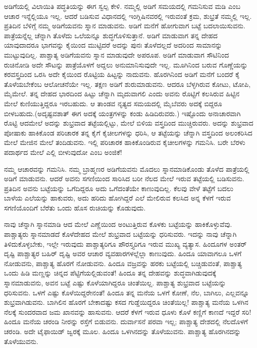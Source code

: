 ಅಡಿಗೆಯಲ್ಲಿ ವಿಲಾಯಿತಿ ಪದ್ಧತಿಯನ್ನು ಈಗ ಸ್ವಲ್ಪ ಕೇಳಿ. ನಮ್ಮಲ್ಲಿ ಅಡಿಗೆ ಸಮಯದಲ್ಲಿ ಗಮನಿಸುವ ಮಡಿ ಎಂಬ ಆಚಾರ ಇನ್ನೆಲ್ಲಿಯೂ ಇಲ್ಲ. ಆದರೆ ಬಡಿಸುವ ವಿಧಾನದಲ್ಲಿ ಇಂಗ್ಲಿಷಿನವರಲ್ಲಿ ಇರುವಂತೆ ಕ್ರಮ, ಶುಭ್ರತೆ ನಮ್ಮಲ್ಲಿ ಇಲ್ಲ. ಪ್ರತಿದಿನ ಬೆಳಿಗ್ಗೆ ನಮ್ಮ ಅಡಿಗೆಯವನು ಸ್ನಾನ ಮಾಡುವನು. ಅಡಿಗೆ ಮನೆಗೆ ಹೋಗುವಾಗ ಬಟ್ಟೆ ಬದಲಾಯಿಸು\break ವನು. ಪಾತ್ರೆಯನ್ನೆಲ್ಲ ಚೆನ್ನಾಗಿ ತೊಳೆದು ಒಲೆಯನ್ನೂ ಶುದ್ಧಗೊಳಿಸುತ್ತಾನೆ. ಅಡಿಗೆ ಮಾಡುವಾಗ ತನ್ನ ದೇಹದ ಯಾವುದಾದರೂ ಭಾಗವನ್ನು ಕೈಯಿಂದ ಮುಟ್ಟಿದರೆ ಅದನ್ನು ಪುನಃ ತೊಳೆದಲ್ಲದೆ ಅದರಿಂದ ಸಾಮಾನನ್ನು ಮುಟ್ಟುವುದಿಲ್ಲ. ಪಾಶ್ಚಾತ್ಯ ಅಡಿಗೆಯವನು ಸ್ನಾನ ಮಾಡುವುದೇ ಅಪರೂಪ. ಅಡಿಗೆ ಮಾಡುವಾಗ ಸೌಟಿನಿಂದ ರುಚಿನೋಡಿ ಅದೇ ಸೌಟನ್ನು ಪಾತ್ರೆಯೊಳಗೆ ಅದ್ದಲು ಅನುಮಾನಿಸುವುದೇ ಇಲ್ಲ. ಮೂಗಿನಿಂದ ಬರುವ ಗೊಣ್ಣೆಯನ್ನು ಕರವಸ್ತ್ರದಿಂದ ಒರಸಿ ಅದೇ ಕೈಯಿಂದ ರೊಟ್ಟಿಯ ಹಿಟ್ಟನ್ನು ನಾದುವನು. ಹೊರಗಿನಿಂದ ಅಡಿಗೆ ಮನೆಗೆ ಬಂದರೆ ಕೈ ತೊಳೆಯಬೇಕೆಂಬ ಆಲೋಚನೆಯೇ ಇಲ್ಲ. ತಕ್ಷಣ ಅಡಿಗೆ ಶುರುಮಾಡುವನು. ಆದರೂ ಬೆಳ್ಳಗಿರುವ ಕೋಟು, ಟೋಪಿ, ಮೈಮೇಲೆ. ತನ್ನ ದೇಹದ ಭಾರದಿಂದ ಹಿಟ್ಟು ಚೆನ್ನಾಗಿ ಮೃದುವಾಗಲಿ ಎಂದು ಅವನು ರೊಟ್ಟಿಗೆ ಕಲಸಿರುವ ಹಿಟ್ಟಿನ ಮೇಲೆ ಕುಣಿಯುತ್ತಿದ್ದರೂ ಇರಬಹುದು. ಆ ತಾಂಡವ ನೃತ್ಯದ ಸಮಯದಲ್ಲಿ ಮೈಬೆವರು ಅದಕ್ಕೆ ಬಿದ್ದರೂ ಬೀಳಬಹುದು.(ಅದೃಷ್ಟವಶಾತ್​ ಈಗ ಅದಕ್ಕೆ ಯಂತ್ರಗಳನ್ನು ಕಂಡು ಹಿಡಿದಿರುವರು.) ಇಷ್ಟೊಂದು ಅನಾಚಾರವಾಗಿ ರೊಟ್ಟಿ ಆದಮೇಲೆ ಅದನ್ನು ಶುಭ್ರವಾದ ತಟ್ಟೆಯಲ್ಲಿಟ್ಟು, ಮೇಲೆ ಬಿಳಿಯ ವಸ್ತ್ರದಿಂದ ಮುಚ್ಚಿರುವರು. ಅದನ್ನು ಶುಭ್ರವಾದ ಪೋಷಾಕು ಹಾಕಿಕೊಂಡ ಪರಿಚಾರಕ ತನ್ನ ಕೈಗೆ ಕೈಚೀಲಗಳನ್ನು ಧರಿಸಿ, ಆ ತಟ್ಟೆಯನ್ನು ಚೆನ್ನಾಗಿ ವಸ್ತ್ರದಿಂದ ಅಲಂಕರಿಸಿದ ಮೇಲೆ ಮೇಜಿನ ಮೇಲೆ ತಂದಿಡುವನು. ಇಲ್ಲಿ ಪರಿಚಾರಕ ಹಾಕಿಕೊಂಡಿರುವ ಕೈಚೀಲಗಳನ್ನು ಗಮನಿಸಿ. ಬರೇ ಬೆರಳು ಪದಾರ್ಥದ ಮೇಲೆ ಎಲ್ಲಿ ಬೀಳುವುದೋ ಎಂಬ ಅಂಜಿಕೆ!

ನಮ್ಮ ಆಚಾರವನ್ನು ಗಮನಿಸಿ. ನಮ್ಮ ಬ್ರಾಹ್ಮಣರ ಅಡಿಗೆಯವನು ಮೊದಲು ಸ್ನಾನಮಾಡಿಕೊಂಡು ತೊಳೆದ ಪಾತ್ರೆಯಲ್ಲಿ ಅಡಿಗೆ ಮಾಡುವನು. ಆದರೆ ಅವನು ಸಗಣಿ\break ಯಿಂದ ಸಾರಿಸಿದ ಬರೀ ನೆಲದ ಮೇಲೆ ಇರುವ ತಟ್ಟೆಯಲ್ಲಿ ಬಡಿಸುವನು. ಪ್ರತಿದಿನ ಅವನು ಬಟ್ಟೆಯನ್ನು ಒಗೆದಿದ್ದರೂ ಅದು ಒಗೆದಂತೆಯೇ ಕಾಣುವುದಿಲ್ಲ. ಕೆಲವು ವೇಳೆ ತಟ್ಟೆಗೆ ಬದಲು ಬಾಳೆಯ ಎಲೆಯನ್ನು ಹಾಕುವರು, ಅದು ಹರಿದು ಹೋಗಿದ್ದರೆ ಎಲೆ ಮೇಲಿರುವ ಕಲಸಿದ ಅನ್ನ ಕೆಳಗೆ ಇರುವ ಸಗಣಿಯೊಂದಿಗೆ ಬೆರೆತು ಒಂದು ಹೊಸ ರುಚಿಯನ್ನು ಕೊಡುವುದು.

\newpage

ನಾವು ಚೆನ್ನಾಗಿ ಸ್ನಾನಮಾಡಿ ಆದ ಮೇಲೆ ಎಣ್ಣೆಯಿಂದ ಅಂಟುತ್ತಿರುವ ಕೊಳಕು ಬಟ್ಟೆಯನ್ನು ಹಾಕಿಕೊಳ್ಳುವೆವು. ಪಾಶ್ಚಾತ್ಯರು ಸ್ನಾನಮಾಡದೆ ಕೊಳೆದೇಹದ ಮೇಲೆ ಶುಭ್ರ\break ವಾದ ಬಟ್ಟೆಯನ್ನು ಧರಿಸುವರು. ಇದನ್ನು ನಾವು ಚೆನ್ನಾಗಿ ತಿಳಿದುಕೊಳ್ಳಬೇಕು, ಇಲ್ಲೇ ಇರುವುದು ಪಾಶ್ಚಾತ್ಯರಿಗೂ ಪೌರಸ್ತ್ಯರಿಗೂ ಇರುವ ಮುಖ್ಯ ವ್ಯತ್ಯಾಸ. ಹಿಂದೂಗಳ ಅಂತರ್​ ದೃಷ್ಟಿ ಪಾಶ್ಚಾತ್ಯರ ಬಹಿರ್​ ದೃಷ್ಟಿ ಅವರ ಆಚಾರ ವ್ಯವಹಾರಗಳಲ್ಲೆಲ್ಲಾ ಕಾಣುವುದು. ಹಿಂದೂ ಯಾವಾಗಲೂ ಒಳಗೆ ನೋಡುವನು, ಪಾಶ್ಚಾತ್ಯ ಹೊರಗೆ ನೋಡುವನು. ಹಿಂದೂ ವಜ್ರವನ್ನು ಹರಕು ಬಟ್ಟೆಯಲ್ಲಿ ಬಚ್ಚಿಡುವಂತೆ, ಪಾಶ್ಚಾತ್ಯ ಒಂದು ಹಿಡಿ ಮಣ್ಣನ್ನು ಚಿನ್ನದ ಪೆಟ್ಟಿಗೆಯಲ್ಲಿಡುವಂತೆ! ಹಿಂದೂ ತನ್ನ ದೇಹವನ್ನು ಶುದ್ಧವಾಗಿಡುವುದಕ್ಕೆ ಸ್ನಾನಮಾಡುವನು, ಅವನ ಬಟ್ಟೆ ಎಷ್ಟು ಕೊಳೆಯಾಗಿದ್ದರೂ ಚಿಂತೆಯಿಲ್ಲ. ಪಾಶ್ಚಾತ್ಯ ಶುಭ್ರವಾದ ಬಟ್ಟೆಯನ್ನು ಧರಿಸುವನು. ಒಳಗೆ ಎಷ್ಟು ಕೊಳೆಯಿದ್ದರೇನಂತೆ! ಹಿಂದೂ ತನ್ನ ಮನೆಯ ಒಳಗೆ ಕೋಣೆ, ನೆಲ, ಬಾಗಿಲು, ಎಲ್ಲವನ್ನೂ ಶುಭ್ರವಾಗಿಡುವನು. ಬಾಗಿಲಿನ ಹೊರಗೆ ಬೇಕಾದಷ್ಟು ಕಸದ ಗುಡ್ಡೆಯಿದ್ದರೂ ಚಿಂತೆಯಿಲ್ಲ! ಪಾಶ್ಚಾತ್ಯ ಮನೆಯ ಒಳಗಿನ ನೆಲಕ್ಕೆ ಸುಂದರವಾದ ಜಮ ಖಾನವನ್ನು ಹಾಸುವನು. ಆದರೆ ಕೆಳಗೆ ಇರುವ ಧೂಳು ಕೊಳೆ ಕಣ್ಣಿಗೆ ಕಾಣದೆ ಇದ್ದರೆ ಸರಿ! ಹಿಂದೂ ಮನೆಯ ಚರಂಡಿ ನೀರನ್ನು ರಸ್ತೆಗೆ ಬಿಡುವನು. ದುರ್ವಾಸನೆ ಪರವಾ ಇಲ್ಲ; ಪಾಶ್ಚಾತ್ಯ ದೇಶದಲ್ಲಿ ನೆಲದೊಳಗೆ ಚರಂಡಿ. ಅದೇ ಟೈಫಾಯಿಡ್​ ಜ್ವರಕ್ಕೆ ಮೂಲ. ಹಿಂದೂ ಒಳಗಿನದನ್ನು ತೊಳೆಯುವನು. ಪಾಶ್ಚಾತ್ಯ ಹೊರಗಿನದನ್ನು ತೊಳೆಯುವನು.

